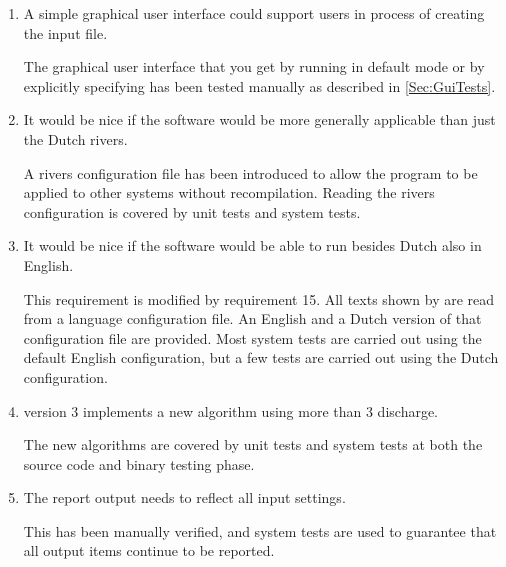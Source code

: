 \begin{enumerate}
\item \begin{requirement}
A simple graphical user interface could support users in process of creating the input file.
\end{requirement}
\begin{testmethod}
The graphical user interface that you get by running \dfastmi in default mode or by explicitly specifying  has been tested manually as described in \autoref{Sec:GuiTests}.
\end{testmethod}

\item \begin{requirement}
It would be nice if the software would be more generally applicable than just the Dutch rivers.
\end{requirement}
\begin{testmethod}
A rivers configuration file has been introduced to allow the program to be applied to other systems without recompilation.
Reading the rivers configuration is covered by unit tests and system tests.
\end{testmethod}

\item \begin{requirement}
It would be nice if the software would be able to run besides Dutch also in English.
\end{requirement}
\begin{testmethod}
This requirement is modified by requirement 15.
All texts shown by \dfastmi are read from a language configuration file.
An English and a Dutch version of that configuration file are provided.
Most system tests are carried out using the default English configuration, but a few tests are carried out using the Dutch configuration.
\end{testmethod}

\item \begin{requirement}
\dfastmi version 3 implements a new algorithm using more than 3 discharge.
\end{requirement}
\begin{testmethod}
The new algorithms are covered by unit tests and system tests at both the source code and binary testing phase.
\end{testmethod}

\item \begin{requirement}
The report output needs to reflect all input settings.
\end{requirement}
\begin{testmethod}
This has been manually verified, and system tests are used to guarantee that all output items continue to be reported.
\end{testmethod}


\end{enumerate}
